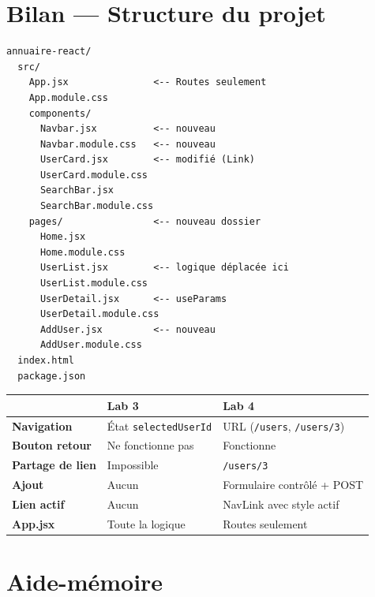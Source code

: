 \documentclass[11pt,a4paper]{article}
\begin{document}
\section{Bilan --- Structure du projet}

\begin{lstlisting}[style=terminal]
annuaire-react/
  src/
    App.jsx               <-- Routes seulement
    App.module.css
    components/
      Navbar.jsx          <-- nouveau
      Navbar.module.css   <-- nouveau
      UserCard.jsx        <-- modifié (Link)
      UserCard.module.css
      SearchBar.jsx
      SearchBar.module.css
    pages/                <-- nouveau dossier
      Home.jsx
      Home.module.css
      UserList.jsx        <-- logique déplacée ici
      UserList.module.css
      UserDetail.jsx      <-- useParams
      UserDetail.module.css
      AddUser.jsx         <-- nouveau
      AddUser.module.css
  index.html
  package.json
\end{lstlisting}

\begin{retenirbox}
\begin{center}
\begin{tabular}{lp{4.5cm}p{4.5cm}}
\toprule
& \textbf{Lab 3} & \textbf{Lab 4} \\
\midrule
\textbf{Navigation} & État \texttt{selectedUserId} & URL (\texttt{/users}, \texttt{/users/3}) \\
\textbf{Bouton retour} & Ne fonctionne pas & Fonctionne \\
\textbf{Partage de lien} & Impossible & \texttt{/users/3} \\
\textbf{Ajout} & Aucun & Formulaire contrôlé + POST \\
\textbf{Lien actif} & Aucun & NavLink avec style actif \\
\textbf{App.jsx} & Toute la logique & Routes seulement \\
\bottomrule
\end{tabular}
\end{center}
\end{retenirbox}

\section{Aide-mémoire}
\end{document}

